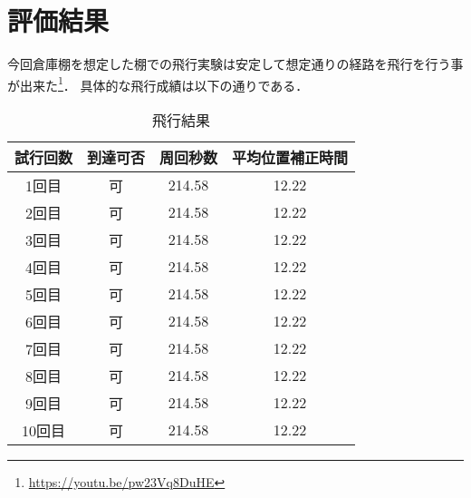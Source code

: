 \section{評価結果}
今回倉庫棚を想定した棚での飛行実験は安定して想定通りの経路を飛行を行う事が出来た\footnote{\url{https://youtu.be/pw23Vq8DuHE}}．
具体的な飛行成績は以下の通りである．

\begin{table}[h]
    \caption{飛行結果}
    \label{table:fly_result}
    \centering
    \begin{tabular}{cccc}
        \hline
        試行回数 & 到達可否 & 周回秒数 & 平均位置補正時間 \\
        \hline \hline
        1回目 & 可 & 214.58 & 12.22 \\
        2回目 & 可 & 214.58 & 12.22 \\
        3回目 & 可 & 214.58 & 12.22 \\
        4回目 & 可 & 214.58 & 12.22 \\
        5回目 & 可 & 214.58 & 12.22 \\
        6回目 & 可 & 214.58 & 12.22 \\
        7回目 & 可 & 214.58 & 12.22 \\
        8回目 & 可 & 214.58 & 12.22 \\
        9回目 & 可 & 214.58 & 12.22 \\
        10回目 & 可 & 214.58 & 12.22 \\
        \hline
    \end{tabular}
\end{table}